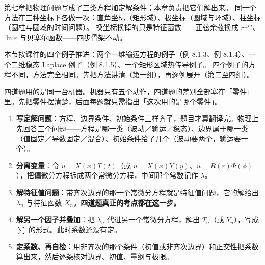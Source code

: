 \label{sec:ch8}

第七章把物理问题写成了三类方程加定解条件；本章负责把它们解出来。
同一个方法在三种坐标下各做一次：直角坐标（矩形域）、极坐标（圆域与环域）、柱坐标（圆柱与圆域的时间问题）。
换坐标换掉的只是特征函数——正弦余弦换成 $r^{\pm m}$、$\ln r$ 与贝塞尔函数——四步骨架不动。

\label{sec:81}

本节按课件的四个例子推进：两个一维输运方程的例子（例 8.1.3、例 8.1.4）、一个二维稳态 Laplace 例子（例 8.1.5）、一个矩形区域热传导例子。
四个例子的方程不同，方法完全相同。先把方法讲清（第一组），再逐例展开（第二至四组）。




四道题用的是同一台机器。机器只有五个动作，四道题的差别全部塞在「零件」里。先把零件摆清楚，后面每题就只需指出「这次用的是哪个零件」。

\label{sec:8111}

\begin{enumerate}[label=\textbf{(\arabic*)}]
  \item \textbf{写定解问题}：方程、边界条件、初始条件三样齐了，题目才算翻译完。物理上先回答三个问题——方程是哪一类（波动／输运／稳态）、边界属于哪一类（值固定／导数固定／混合）、初始条件给了几个（波动要两个，输运要一个）。
  \item \textbf{分离变量}：令 $u=X(x)T(t)$（或 $u=X(x)Y(y)$、$u=R(r)\Phi(\phi)$），把偏微分方程拆成两个常微分方程，中间那个常数记作 $\lambda$。
  \item \textbf{解特征值问题}：带齐次边界的那一个常微分方程就是特征值问题，它的解给出 $\lambda_n$ 与特征函数 $X_n$。\textbf{四道题真正的考点都在这一步。}
  \item \textbf{解另一个因子并叠加}：把 $\lambda_n$ 代进另一个常微分方程，解出 $T_n$（或 $Y_n$），写成 $\sum$ 的形式。此时系数还没有定。
  \item \textbf{定系数、再自检}：用非齐次的那个条件（初值或非齐次边界）和正交性把系数算出来，然后逐条核对边界、初值、量纲与极限。
\end{enumerate}


